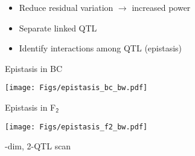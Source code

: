 \documentclass[12pt]{article}
\newcommand{\headsize}{\fontsize{35}{35} \selectfont}
\newcommand{\smallsize}{\fontsize{25}{30} \selectfont}
\begin{document}
\vspace{3cm}

\color{mywhite} \smallsize

\hfill \begin{minipage}[t]{10in}
\begin{itemize}
\itemsep24pt
\item Reduce residual variation $\longrightarrow$ increased power

\item Separate linked QTL

\item Identify interactions among QTL {\color{myblue} (epistasis)}

\end{itemize}
\end{minipage}


\newpage

\headsize \color{myyellow}
\hfill \begin{minipage}{5.75in}
\centering
Epistasis in BC
\end{minipage}

\vfill

\centerline{\texttt{[image: Figs/epistasis\_bc\_bw.pdf]}}


\newpage

\headsize \color{myyellow}
\hfill \begin{minipage}{5.75in}
\centering
Epistasis in F$_{\mathsf{2}}$
\end{minipage}

\vfill

\centerline{\texttt{[image: Figs/epistasis\_f2\_bw.pdf]}}

\newpage

\headsize \color{myyellow}
\hfill \begin{minipage}{5.75in}
-dim, 2-QTL scan
\end{minipage}

\vspace{2cm}

\color{mywhite} \smallsize
\end{document}
